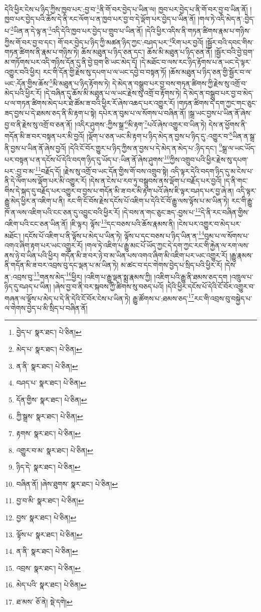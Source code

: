 དེའི་ཕྱིར་ངེས་པ་ཉིད་ཀྱིས་ཁྱབ་པར་:བྱ་བ་\footnote{བྱེད་པ་  སྣར་ཐང་།  པེ་ཅིན། }ནི་གོ་བར་བྱེད་པ་ཡིན་ལ། ཁྱབ་པར་བྱེད་པ་ནི་གོ་བར་བྱ་བ་ཡིན་ནོ། །ཁྱབ་པར་བྱེད་པའི་ཆོས་དེ་ནི་རང་ལོག་པ་ན་ཁྱབ་པར་བྱ་བ་དེ་ལྡོག་པར་བྱེད་པ་ཡིན་ནོ། །གལ་ཏེ་འདི་མེད་ན་:བྱེད་པ་\footnote{མེད་པ་  སྣར་ཐང་།  པེ་ཅིན། }ཡིན་ན་དེ་ལྟ་ན་\footnote{ན་ནི་  སྣར་ཐང་།  པེ་ཅིན། }འདི་དེའི་ཁྱབ་པར་བྱེད་པ་གྲུབ་པ་ཡིན་ནོ། །དེའི་ཕྱིར་འདིས་ནི་གཏན་ཚིགས་རྣམ་པ་གཉིས་ཀྱིས་གོ་བར་བྱ་བ་དང་། གོ་བར་བྱེད་པ་ཉིད་ཀྱི་མཚན་ཉིད་ཀྱང་:བཤད་པར་\footnote{བཤད་པ་  སྣར་ཐང་།  པེ་ཅིན། }རིག་པར་བྱའོ། །སྦྱོར་བའི་དབང་གིས་གཏན་ཚིགས་ནི་རྣམ་པ་གཉིས་ཏེ། ཆོས་མཐུན་པ་ཉིད་ཅན་དང་། ཆོས་མི་མཐུན་པ་ཉིད་ཅན་ནོ། །སྦྱོར་བའི་བྱེ་བྲག་མ་གཏོགས་པར་འདི་གཉིས་དོན་དུ་ནི་བྱེ་བྲག་ཅི་ཡང་མེད་དོ། །དེ་མཐོང་བ་ལས་རང་ཉིད་རྟོགས་པ་ན་ཡང་དེ་ལྟར་འགྱུར་བའི་ཕྱིར། རང་གི་དོན་གྱི་རྗེས་སུ་དཔག་པ་ལ་ཡང་དབྱེ་བ་བསྟན་ཏོ། །ཆོས་མཐུན་པ་ཉིད་ཅན་གྱི་སྦྱོར་བ་ལ་ཡང་:དོན་གྱིས་ཆོས་\footnote{དོན་གྱིས་  སྣར་ཐང་།  པེ་ཅིན། }མི་མཐུན་པ་ཉིད་རྟོགས་ཏེ། དེ་མེད་ན་བསྒྲུབ་པར་བྱ་བས་གཏན་ཚིགས་ཀྱི་རྗེས་སུ་འགྲོ་བ་མེད་པའི་ཕྱིར་རོ། །དེ་བཞིན་དུ་ཆོས་མི་མཐུན་པ་ལ་ཡང་རྗེས་སུ་འགྲོ་བ་རྟོགས་ཏེ། དེ་མེད་ན་བསྒྲུབ་པར་བྱ་བ་མེད་པ་ལ་གཏན་ཚིགས་མེད་པར་ཐེ་ཚོམ་ཟ་བའི་ཕྱིར་རོ་ཞེས་འཆད་པར་འགྱུར་རོ། །གཏན་ཚིགས་དེ་དག་ཀྱང་གང་ཅུང་ཟད་བྱས་པ་དེ་ཐམས་ཅད་ནི་མི་རྟག་པ་སྟེ། དཔེར་ན་བུམ་པ་ལ་སོགས་པ་བཞིན་ནོ། །སྒྲ་ཡང་བྱས་པ་ཡིན་ནོ་ཞེས་བྱ་བ་ནི་རྗེས་སུ་འགྲོ་བ་ཅན་ནོ། །འདིར་ཤུགས་:ཀྱིས་སྒྲ་\footnote{ཀྱི་སྒྲས་  སྣར་ཐང་།  པེ་ཅིན། }མི་རྟག་\footnote{རྟགས་  སྣར་ཐང་།  པེ་ཅིན། }པའོ་ཞེས་འགྱུར་བ་ཡིན་ཏེ། དེས་ན་ཕྱོགས་ནི་གདོན་མི་ཟ་བར་བསྟན་པར་མི་བྱའོ། །ལྡོག་པ་ཅན་ཡང་མི་རྟག་པ་ཉིད་མེད་ན་བྱས་པ་ཉིད་དུ་:འགྱུར་བ་\footnote{འགྱུར་བ་མ་  སྣར་ཐང་།  པེ་ཅིན། }ཡིན་ན་སྒྲ་ནི་བྱས་པ་ཡིན་ནོ་ཞེས་བྱའོ། །དེའི་ངོ་བོར་གྱུར་པ་ཉིད་ཀྱིས་ན་བྱས་པ་དེ་མེད་ན་མེད་པ་:ཉིད་དང་། \footnote{ཉིད་དེ་  སྣར་ཐང་།  པེ་ཅིན། }སྒྲ་ལ་ཡང་ཡོད་པར་བསྟན་པ་ན་དངོས་པོ་དེའི་བདག་ཉིད་དུ་ཡོད་པ་:ཡིན་ནོ་ཞེས་ཤུགས་\footnote{བཞིན་ནོ། །ཞེས་ཐུགས་  སྣར་ཐང་།  པེ་ཅིན། }ཀྱིས་འགྲུབ་པའི་ཕྱིར་རྗེས་སུ་དཔག་པར་:བྱ་བ་མ་\footnote{བྱ་བ་མི་  སྣར་ཐང་།  པེ་ཅིན། }བརྗོད་དོ། །རྗེས་སུ་འགྲོ་བ་ཡང་དོན་གྱིས་གོ་བས་འགྲུབ་སྟེ། འདི་ལྟར་དེའི་བདག་ཉིད་དུ་མ་ངེས་པ་ནི་དེ་ལོག་པས་ལྡོག་པར་མི་འགྱུར་རོ། །དེས་ན་ངེས་པ་རབ་ཏུ་བསྒྲུབས་ནས་ལྡོག་པ་བརྗོད་པར་བྱའོ། །ད་ནི་གང་གིས་དེ་སྐད་དུ་བརྗོད་པར་འགྱུར་བ་བྱས་པ་གདོན་མི་ཟ་བར་མི་རྟག་པའོ་ཞེས་ཇི་ལྟར་བཤད་པར་བྱ་ཞེ་ན། འདི་ལྟར་རྒྱུ་མེད་ཕྱིར་ན་འཇིག་པ་ནི། རང་གི་ངོ་བོས་རྗེས་དངོས་པོ་འཇིག་པ་དེའི་ངོ་བོ་རྒྱུ་ལས་ལྟོས་པ་མ་ཡིན་ཏེ། རང་གི་རྒྱུ་ཁོ་ན་ལས་འཇིག་པའི་ངང་ཅན་དུ་འབྱུང་བའི་ཕྱིར་རོ། །དེ་བས་ན་གང་ཅུང་ཟད་:བྱས་པ་\footnote{བྱས་  སྣར་ཐང་།  པེ་ཅིན། }དེ་ནི་རང་བཞིན་གྱིས་འཇིག་པའི་ངང་ཅན་ཡིན་ནོ། །ཇི་ལྟར། ལྟོས་\footnote{ལྟོས་པ་  སྣར་ཐང་།  པེ་ཅིན། }དང་བཅས་པའི་ཆོས་རྣམས་ནི། །ངེས་པར་འགྱུར་བ་མེད་པར་མཐོང་། །དངོས་པོ་འཇིག་པ་ནི་ལྟོས་པ་མེད་པ་ཡིན་ཏེ། ལྟོས་པ་དང་བཅས་པ་ཉིད་ཡིན་ན་\footnote{ན་ནི་  སྣར་ཐང་།  པེ་ཅིན། }བུམ་པ་ལ་སོགས་པ་འགའ་ཞིག་རྟག་པར་ཡང་འགྱུར་རོ། །གལ་ཏེ་འཇིག་པ་རྒྱུ་མང་པོ་ཡོད་ཀྱང་དེ་དག་ཀྱང་རང་གི་རྐྱེན་ལ་རག་ལས་ནས་ཉེ་བ་ཡིན་པའི་ཕྱིར། གདོན་མི་ཟ་བར་ཉེ་བ་མ་ཡིན་པས་འགའ་ཞིག་མི་འཇིག་པར་ཡང་འགྱུར་རོ། །རྒྱུ་རྣམས་ནི་གདོན་མི་ཟ་བར་འབྲས་བུ་དང་ལྡན་པ་མ་ཡིན་ཏེ། མ་ཚང་བ་དང་གེགས་བྱེད་པ་སྲིད་པའི་ཕྱིར་རོ། །དེས་ན་:འབྲས་བུ་\footnote{འབྲས་  སྣར་ཐང་།  པེ་ཅིན། }གནས་མེད་\footnote{མེད་པའི་  སྣར་ཐང་།  པེ་ཅིན། }ཕྱིར། །འཇིག་པ་རྒྱུ་ལྡན་སྨྲ་རྣམས་ཀྱི། །འཇིག་པའི་རྒྱུ་ནི་ཐམས་ཅད་དག །འཁྲུལ་པ་ཉིད་དུ་བཤད་པ་ཡིན། །ཞེས་བྱ་བ་ནི་བར་སྐབས་ཀྱི་ཚིགས་སུ་བཅད་པའོ། །དེའི་ཕྱིར་དངོས་པོ་དེའི་ངོ་བོར་འགྱུར་བ་གཞན་ལ་ལྟོས་པ་མེད་པ་དེ་ནི་དེའི་ངོ་བོར་ངེས་པ་ཡིན་ཏེ། རྒྱུ་ཚོགས་པ་:ཐམས་ཅད་\footnote{ཐ་མས་  ཅོ་ནེ།  སྡེ་དགེ། }རང་གི་འབྲས་བུ་བསྐྱེད་པ་ལ་གེགས་བྱེད་པ་མི་སྲིད་པ་བཞིན་ནོ། 